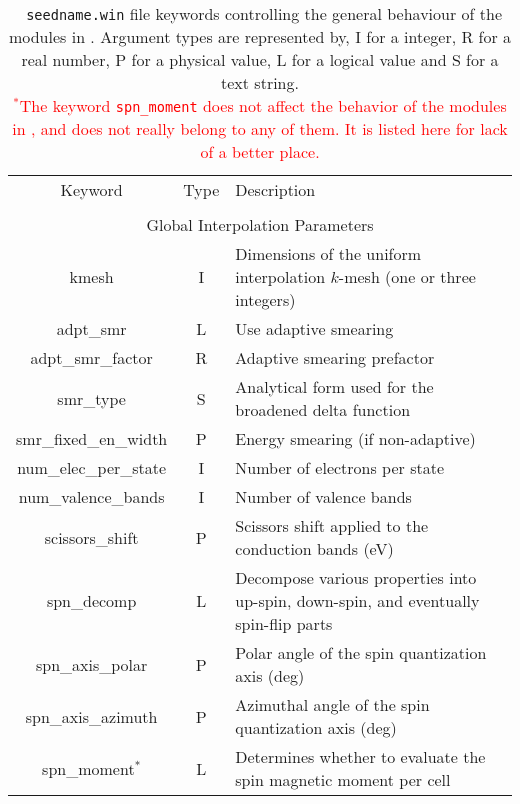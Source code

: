 \begin{table}[hH!]
\begin{center}
\begin{tabular}{|c|c|p{6cm}|}
  \hline
  Keyword & Type & Description \\
  &      &             \\
  \hline\hline
  \multicolumn{3}{|c|}{Global Interpolation Parameters} \\
  \hline
  {\sc kmesh}   & I & Dimensions of the uniform interpolation $k$-mesh 
(one or three integers) \\
  {\sc adpt\_smr}   & L & Use adaptive smearing\\
  {\sc adpt\_smr\_factor}   & R & Adaptive smearing prefactor\\
  {\sc smr\_type}   & S &  Analytical form used for the broadened delta function\\
  {\sc smr\_fixed\_en\_width}   & P & Energy smearing (if non-adaptive)\\
  {\sc num\_elec\_per\_state}   & I & Number of electrons per state \\
  {\sc num\_valence\_bands}   & I & Number of valence bands \\
  {\sc scissors\_shift}   & P & Scissors shift applied to the conduction bands (eV) \\
  {\sc spn\_decomp}& L & Decompose various properties into
  up-spin, down-spin, and eventually spin-flip parts\\
  {\sc spn\_axis\_polar}& P & Polar angle of the spin quantization axis (deg)\\
  {\sc spn\_axis\_azimuth}& P & Azimuthal angle of the spin quantization axis (deg)\\
  {\sc spn\_moment}$^*$& L & Determines whether to evaluate the spin 
magnetic moment per cell\\  \hline
\end{tabular}
\caption[Parameter file keywords controlling \postw.]  {{\tt
    seedname.win} file keywords controlling the general behaviour of
  the modules in \postw. Argument types are represented by, I for a
  integer, R for a real number, P for a
  physical value, L for a logical value and S for a text string.\\
  \textcolor{red}{$^*$The keyword {\tt spn\_moment} does not affect
    the behavior of the modules in \postw, and does not really belong
    to any of them. It is listed here for lack of a better place.}}
\label{parameter_keywords_postw90}
\end{center}
\end{table}



